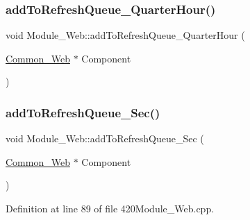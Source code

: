 \subsubsection{\texorpdfstring{add\+To\+Refresh\+Queue\+\_\+\+Quarter\+Hour()}{addToRefreshQueue\_QuarterHour()}\hspace{0.1cm}{\footnotesize\ttfamily [2/2]}}
{\footnotesize\ttfamily void Module\+\_\+\+Web\+::add\+To\+Refresh\+Queue\+\_\+\+Quarter\+Hour (\begin{DoxyParamCaption}\item[{\hyperlink{class_common___web}{Common\+\_\+\+Web} $\ast$}]{Component }\end{DoxyParamCaption})}

\mbox{\label{class_module___web_a125e0abaefa5c6ab2379162a3ea9cf55}} 
\subsubsection{\texorpdfstring{add\+To\+Refresh\+Queue\+\_\+\+Sec()}{addToRefreshQueue\_Sec()}\hspace{0.1cm}{\footnotesize\ttfamily [1/2]}}
{\footnotesize\ttfamily void Module\+\_\+\+Web\+::add\+To\+Refresh\+Queue\+\_\+\+Sec (\begin{DoxyParamCaption}\item[{\hyperlink{class_common___web}{Common\+\_\+\+Web} $\ast$}]{Component }\end{DoxyParamCaption})}



Definition at line 89 of file 420\+Module\+\_\+\+Web.\+cpp.

